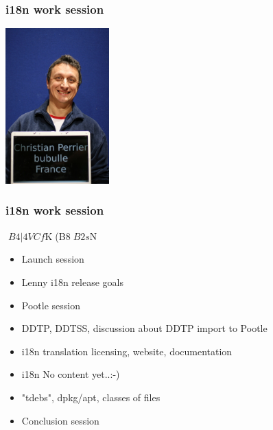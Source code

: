 \documentclass[cjk,dvipdfmx,12pt]{beamer}
\begin{document}
\begin{frame}
\frametitle{i18n work session} 
  \begin{minipage}{0.4\hsize}
  \end{minipage}
  \begin{minipage}{0.4\hsize}
    \includegraphics[width=4cm]{image200707/bubulle.jpg}  
  \end{minipage}
\end{frame}

\begin{frame}
\frametitle{i18n work session} 
$B4|4VCf$K(B8$B2s$N%

  \begin{itemize}
     \item Launch session
     \item Lenny i18n release goals
     \item Pootle session
     \item DDTP, DDTSS, discussion about DDTP import to Pootle
     \item i18n  translation licensing, website, documentation
     \item i18n No content yet..:-)
     \item "tdebs", dpkg/apt, classes of files
     \item Conclusion session    
    
  \end{itemize}
\end{frame}
\end{document}

